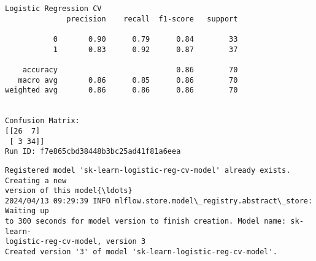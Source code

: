 \documentclass[11pt]{article}
\begin{document}
    \begin{Verbatim}[commandchars=\\\{\}]
Logistic Regression CV
              precision    recall  f1-score   support

           0       0.90      0.79      0.84        33
           1       0.83      0.92      0.87        37

    accuracy                           0.86        70
   macro avg       0.86      0.85      0.86        70
weighted avg       0.86      0.86      0.86        70


Confusion Matrix:
[[26  7]
 [ 3 34]]
Run ID: f7e865cbd38448b3bc25ad41f81a6eea
    \end{Verbatim}

    \begin{Verbatim}[commandchars=\\\{\}]
Registered model 'sk-learn-logistic-reg-cv-model' already exists. Creating a new
version of this model{\ldots}
2024/04/13 09:29:39 INFO mlflow.store.model\_registry.abstract\_store: Waiting up
to 300 seconds for model version to finish creation. Model name: sk-learn-
logistic-reg-cv-model, version 3
Created version '3' of model 'sk-learn-logistic-reg-cv-model'.
    \end{Verbatim}
\end{document}
